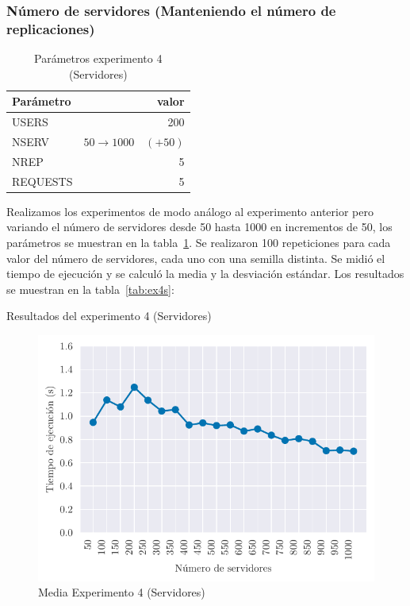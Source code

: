 \subsubsection{Número de servidores (Manteniendo el número de replicaciones)}

\begin{table}[H]
    \caption{Parámetros experimento 4 (Servidores)}%
    \label{tab:ex4s_par}
    \begin{center}
    \begin{tabular}{lr}
    \toprule
    Parámetro & valor \\
    \midrule
    USERS & 200 \\
    NSERV & $50 \to 1000 \quad (+50)$ \\
    NREP & 5 \\
    REQUESTS & 5\\
    \bottomrule
    \end{tabular}
    \end{center}
\end{table}

Realizamos los experimentos de modo análogo al experimento anterior pero variando el número
de servidores desde 50 hasta 1000 en incrementos de 50, los parámetros se muestran en la
tabla~\ref{tab:ex4s_par}. Se realizaron 100 repeticiones para
cada valor del número de servidores, cada uno con una semilla distinta.
Se midió el tiempo de ejecución y se calculó la media
y la desviación estándar. Los resultados se muestran en la tabla~\ref{tab:ex4s}:

\begin{table}[H]
    \caption{Resultados del experimento 4 (Servidores)}%
    \label{tab:ex4s}
    \begin{center}
    
    \end{center}
\end{table}

\begin{figure}[H]
    \centering
    \includegraphics{include/plots/ex4_s_mean_time.pdf}
    \caption{Media Experimento 4 (Servidores)}%
    \label{fig:ex4s_mean}
\end{figure}

